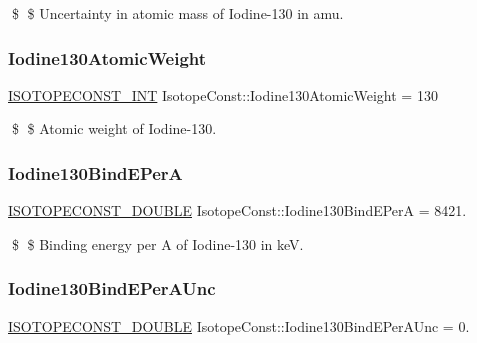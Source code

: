\$ \$ Uncertainty in atomic mass of Iodine-\/130 in amu. \mbox{\label{group___isotope_const-_iodine-_i130_ga708cb69afffaa589eaba4b929d389589}} 
\subsubsection{\texorpdfstring{Iodine130\+Atomic\+Weight}{Iodine130AtomicWeight}}
{\footnotesize\ttfamily \mbox{\hyperlink{group___isotope_const-_macros_ga5f18360b3e99483a35c32d789e62621c}{I\+S\+O\+T\+O\+P\+E\+C\+O\+N\+S\+T\+\_\+\+I\+NT}} Isotope\+Const\+::\+Iodine130\+Atomic\+Weight = 130}

\$ \$ Atomic weight of Iodine-\/130. \mbox{\label{group___isotope_const-_iodine-_i130_gad4c29dc84300e83a4145f8448aef9ac4}} 
\subsubsection{\texorpdfstring{Iodine130\+Bind\+E\+PerA}{Iodine130BindEPerA}}
{\footnotesize\ttfamily \mbox{\hyperlink{group___isotope_const-_macros_ga8f45a7272ce02c0b4c65c44636ed719a}{I\+S\+O\+T\+O\+P\+E\+C\+O\+N\+S\+T\+\_\+\+D\+O\+U\+B\+LE}} Isotope\+Const\+::\+Iodine130\+Bind\+E\+PerA = 8421.}

\$ \$ Binding energy per A of Iodine-\/130 in keV. \mbox{\label{group___isotope_const-_iodine-_i130_ga28cb5e90df4d01f71f136dbfe5c6f956}} 
\subsubsection{\texorpdfstring{Iodine130\+Bind\+E\+Per\+A\+Unc}{Iodine130BindEPerAUnc}}
{\footnotesize\ttfamily \mbox{\hyperlink{group___isotope_const-_macros_ga8f45a7272ce02c0b4c65c44636ed719a}{I\+S\+O\+T\+O\+P\+E\+C\+O\+N\+S\+T\+\_\+\+D\+O\+U\+B\+LE}} Isotope\+Const\+::\+Iodine130\+Bind\+E\+Per\+A\+Unc = 0.}

